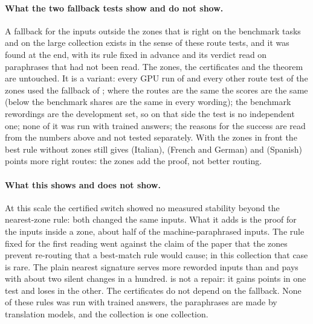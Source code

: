 \paragraph{What the two fallback tests show and do not show.} A fallback for the inputs outside the zones that is right on the benchmark tasks and on the large collection exists in the sense of these route tests, and it was found at the end, with its rule fixed in advance and its verdict read on paraphrases that had not been read. The zones, the certificates and the theorem are untouched. It is a variant: every GPU run of \cert{} and every other route test of the zones used the fallback of \cert{}; where the routes are the same the scores are the same (below the benchmark shares are the same in every wording); the benchmark rewordings are the development set, so on that side the test is no independent one; none of it was run with trained answers; the reasons for the success are read from the numbers above and not tested separately. With the zones in front the best rule without zones still gives \RerouteZonesCost{} (Italian), \RerouteZonesCostFG{} (French and German) and \RerouteZonesCostEs{} (Spanish) points more right routes: the zones add the proof, not better routing.

\paragraph{What this shows and does not show.} At this scale the certified switch showed no measured stability beyond the nearest-zone rule: both changed the same inputs. What it adds is the proof for the inputs inside a zone, about half of the machine-paraphrased inputs. The rule fixed for the first reading went
against the claim of the paper that the zones prevent re-routing that a best-match rule would cause; in this collection that case is rare. The plain nearest signature serves more reworded inputs than \cert{} and pays with about two silent changes in a hundred. \hybrid{} is not a repair: it gains \RerouteHybGain{} points in one test and loses \RerouteHybLoss{} in the other. The certificates
do not depend on the fallback. None of these rules was run with trained answers, the paraphrases are made by translation models, and the collection is one collection.
